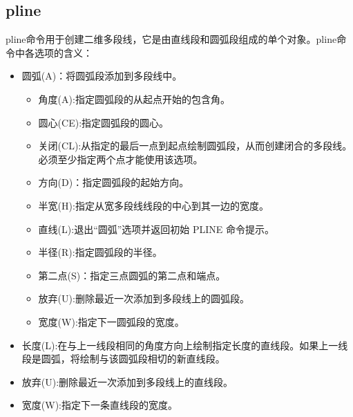 \subsection{pline}
pline命令用于创建二维多段线，它是由直线段和圆弧段组成的单个对象。pline命令中各选项的含义：
\begin{itemize}
\item 圆弧(A)：将圆弧段添加到多段线中。
\begin{itemize}
\item 角度(A):指定圆弧段的从起点开始的包含角。
\item 圆心(CE):指定圆弧段的圆心。
\item 关闭(CL):从指定的最后一点到起点绘制圆弧段，从而创建闭合的多段线。必须至少指定两个点才能使用该选项。
\item 方向(D)：指定圆弧段的起始方向。
\item 半宽(H):指定从宽多段线线段的中心到其一边的宽度。
\item 直线(L):退出“圆弧”选项并返回初始 PLINE 命令提示。
\item 半径(R):指定圆弧段的半径。 
\item 第二点(S)：指定三点圆弧的第二点和端点。
\item 放弃(U):删除最近一次添加到多段线上的圆弧段。 
\item 宽度(W):指定下一圆弧段的宽度。
\end{itemize}
\item 长度(L):在与上一线段相同的角度方向上绘制指定长度的直线段。如果上一线段是圆弧，将绘制与该圆弧段相切的新直线段。
\item 放弃(U):删除最近一次添加到多段线上的直线段。
\item 宽度(W):指定下一条直线段的宽度。
\end{itemize}
\endinput